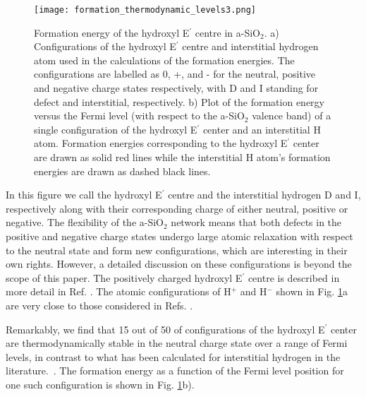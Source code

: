 \documentclass[aps,prb,reprint,superscriptaddress,showpacs]{revtex4-1}
\begin{document}
\begin{figure}[h!]
\texttt{[image: formation\_thermodynamic\_levels3.png]}
\caption{Formation energy of the hydroxyl E$^\prime$ centre in a-SiO$_2$. a) Configurations of the hydroxyl E$^\prime$ centre and interstitial hydrogen atom used in the calculations of the formation energies.  The configurations are labelled as 0, +, and - for the neutral, positive and negative charge states respectively, with D and I standing for defect and interstitial, respectively. b) Plot of the formation energy versus the Fermi level (with respect to the a-SiO$_2$ valence band) of a single configuration of the hydroxyl E$^\prime$ center and an interstitial H atom. Formation energies corresponding to the hydroxyl E$^\prime$ center are drawn as solid red lines while the interstitial H atom's formation energies are drawn as dashed black lines. }
\label{fig:hydroxy_thermodynamic}
\end{figure}

In this figure we call the hydroxyl E$^\prime$ centre and the interstitial hydrogen D and I, respectively along with their corresponding charge of either neutral, positive or negative. The flexibility of the a-SiO$_2$ network means that both defects in the positive and negative charge states undergo large atomic relaxation with respect to the neutral state and form new configurations, which are interesting in their own rights. However, a detailed discussion on these configurations is beyond the scope of this paper. The positively charged hydroxyl E$^\prime$ centre is described in more detail in Ref. \cite{h_charged_mee}. The atomic configurations of H$^+$ and H$^-$ shown in Fig. \ref{fig:hydroxy_thermodynamic}a are very close to those considered in Refs. \cite{godet_hydrogen,robertson_oxides}.

Remarkably, we find that 15 out of 50 of configurations of the hydroxyl E$^\prime$ center are thermodynamically stable in the neutral charge state over a range of Fermi levels, in contrast to what has been calculated for interstitial hydrogen in the literature.~\cite{godet_hydrogen,robertson_oxides}.  The formation energy as a function of the Fermi level position for one such configuration is shown in Fig. \ref{fig:hydroxy_thermodynamic}b). 
\end{document}
